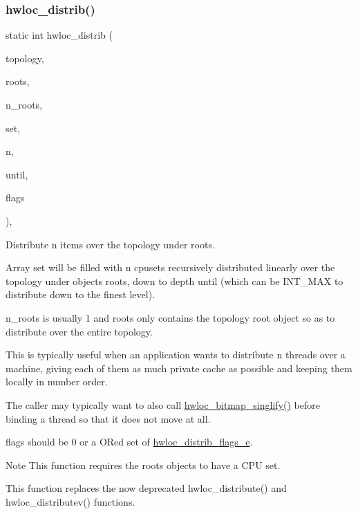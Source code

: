 \subsubsection{\texorpdfstring{hwloc\+\_\+distrib()}{hwloc\_distrib()}}
{\footnotesize\ttfamily static int hwloc\+\_\+distrib (\begin{DoxyParamCaption}\item[{\hyperlink{a00186_ga9d1e76ee15a7dee158b786c30b6a6e38}{hwloc\+\_\+topology\+\_\+t}}]{topology,  }\item[{\hyperlink{a00185_ga79b8ab56877ef99ac59b833203391c7d}{hwloc\+\_\+obj\+\_\+t} $\ast$}]{roots,  }\item[{unsigned}]{n\+\_\+roots,  }\item[{\hyperlink{a00183_ga4bbf39b68b6f568fb92739e7c0ea7801}{hwloc\+\_\+cpuset\+\_\+t} $\ast$}]{set,  }\item[{unsigned}]{n,  }\item[{int}]{until,  }\item[{unsigned long}]{flags }\end{DoxyParamCaption})\hspace{0.3cm}{\ttfamily [inline]}, {\ttfamily [static]}}



Distribute {\ttfamily n} items over the topology under {\ttfamily roots}. 

Array {\ttfamily set} will be filled with {\ttfamily n} cpusets recursively distributed linearly over the topology under objects {\ttfamily roots}, down to depth {\ttfamily until} (which can be I\+N\+T\+\_\+\+M\+AX to distribute down to the finest level).

{\ttfamily n\+\_\+roots} is usually 1 and {\ttfamily roots} only contains the topology root object so as to distribute over the entire topology.

This is typically useful when an application wants to distribute {\ttfamily n} threads over a machine, giving each of them as much private cache as possible and keeping them locally in number order.

The caller may typically want to also call \hyperlink{a00205_gaa611a77c092e679246afdf9a60d5db8b}{hwloc\+\_\+bitmap\+\_\+singlify()} before binding a thread so that it does not move at all.

{\ttfamily flags} should be 0 or a OR\textquotesingle{}ed set of \hyperlink{a00201_ga8b835295a52b6768a5e6c8abb1f9c54d}{hwloc\+\_\+distrib\+\_\+flags\+\_\+e}.

\begin{DoxyNote}{Note}
This function requires the {\ttfamily roots} objects to have a C\+PU set.

This function replaces the now deprecated hwloc\+\_\+distribute() and hwloc\+\_\+distributev() functions. 
\end{DoxyNote}

